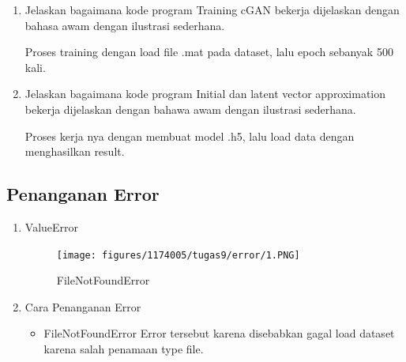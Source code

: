 \begin{enumerate}
	\item Jelaskan bagaimana kode program Training cGAN bekerja dijelaskan dengan bahasa awam dengan ilustrasi sederhana.
	\hfill\break
	
	Proses training dengan load file .mat pada dataset, lalu epoch sebanyak 500 kali.

	\item Jelaskan bagaimana kode program Initial dan latent vector approximation bekerja dijelaskan dengan bahawa awam dengan ilustrasi sederhana.
	\hfill\break
	
	Proses kerja nya dengan membuat model .h5, lalu load data dengan menghasilkan result.
	
\end{enumerate}

\subsection{Penanganan Error}
\begin{enumerate}
	\item ValueError
	\begin{figure}[H]
		\texttt{[image: figures/1174005/tugas9/error/1.PNG]}
		\centering
		\caption{FileNotFoundError}
	\end{figure}

	\item Cara Penanganan Error
	\begin{itemize}
		\item FileNotFoundError
		\hfill\break
		Error tersebut karena disebabkan gagal load dataset karena salah penamaan type file.
	\end{itemize}
\end{enumerate}


